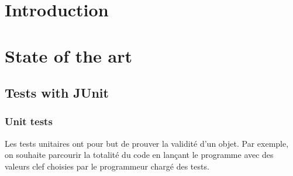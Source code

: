 \documentclass[a4paper]{report}
\begin{document}
\newenvironment{proof}[1][Proof]{\begin{trivlist}
\item[\hskip \labelsep {\bfseries #1}]}{\end{trivlist}}
\newenvironment{definition}[1][Definition]{\begin{trivlist}
\item[\hskip \labelsep {\bfseries #1}]}{\end{trivlist}}
\newenvironment{example}[1][Example]{\begin{trivlist}
\item[\hskip \labelsep {\bfseries #1}]}{\end{trivlist}}
\newenvironment{remark}[1][Rq:]{\begin{trivlist}
\item[\hskip \labelsep {\bfseries #1}]}{\end{trivlist}}
\newenvironment{rappel}[1][rappel:]{\begin{trivlist}
\item[\hskip \labelsep {\bfseries #1}]}{\end{trivlist}}


\chapter*{Introduction}








\chapter*{State of the art}


\section*{Tests with JUnit}

\subsection*{Unit tests}
Les tests unitaires ont pour but de prouver la validité d'un objet. Par exemple, on souhaite parcourir la totalité du code en lançant le programme avec des valeurs clef choisies par le programmeur chargé des tests.
\end{document}
